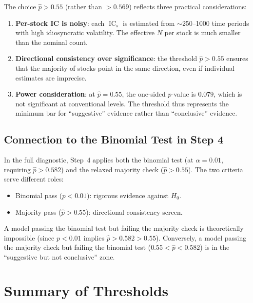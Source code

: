 \documentclass[11pt,a4paper]{article}
\theoremstyle{definition}
\newcommand{\IC}{\operatorname{IC}}
\newcommand{\Ho}{H_{0}}
\begin{document}
The choice $\hat{p} > 0.55$ (rather than $> 0.569$) reflects three practical
considerations:

\begin{enumerate}
    \item \textbf{Per-stock IC is noisy}: each $\IC_s$ is estimated from
          $\sim$250--1000 time periods with high idiosyncratic volatility.
          The effective $N$ per stock is much smaller than the nominal count.
    \item \textbf{Directional consistency over significance}: the threshold
          $\hat{p} > 0.55$ ensures that the majority of stocks point in the
          same direction, even if individual estimates are imprecise.
    \item \textbf{Power consideration}: at $\hat{p} = 0.55$, the
          one-sided $p$-value is $0.079$, which is not significant at
          conventional levels.  The threshold thus represents the minimum
          bar for ``suggestive'' evidence rather than ``conclusive'' evidence.
\end{enumerate}

\subsection{Connection to the Binomial Test in Step 4}

In the full diagnostic, Step~4 applies both the binomial test (at
$\alpha = 0.01$, requiring $\hat{p} > 0.582$) and the relaxed majority
check ($\hat{p} > 0.55$).  The two criteria serve different roles:
\begin{itemize}
    \item Binomial pass ($p < 0.01$): rigorous evidence against $\Ho$.
    \item Majority pass ($\hat{p} > 0.55$): directional consistency screen.
\end{itemize}

A model passing the binomial test but failing the majority check is
theoretically impossible (since $p < 0.01$ implies $\hat{p} > 0.582 > 0.55$).
Conversely, a model passing the majority check but failing the binomial test
($0.55 < \hat{p} < 0.582$) is in the ``suggestive but not conclusive'' zone.

\section{Summary of Thresholds}
\end{document}
